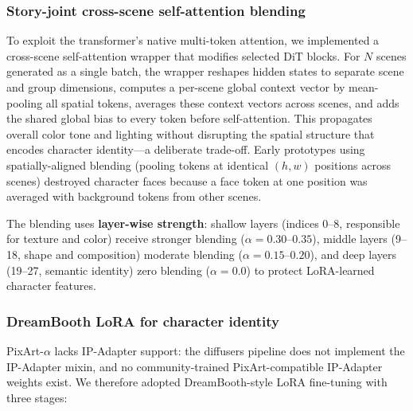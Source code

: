 \subsubsection{Story-joint cross-scene self-attention blending}

To exploit the transformer's native multi-token attention, we implemented a cross-scene self-attention wrapper that modifies selected DiT blocks. For $N$ scenes generated as a single batch, the wrapper reshapes hidden states to separate scene and group dimensions, computes a per-scene global context vector by mean-pooling all spatial tokens, averages these context vectors across scenes, and adds the shared global bias to every token before self-attention. This propagates overall color tone and lighting without disrupting the spatial structure that encodes character identity---a deliberate trade-off. Early prototypes using spatially-aligned blending (pooling tokens at identical $(h,w)$ positions across scenes) destroyed character faces because a face token at one position was averaged with background tokens from other scenes.

The blending uses \textbf{layer-wise strength}: shallow layers (indices 0--8, responsible for texture and color) receive stronger blending ($\alpha=0.30$--$0.35$), middle layers (9--18, shape and composition) moderate blending ($\alpha=0.15$--$0.20$), and deep layers (19--27, semantic identity) zero blending ($\alpha=0.0$) to protect LoRA-learned character features.

\subsubsection{DreamBooth LoRA for character identity}

PixArt-$\alpha$ lacks IP-Adapter support: the diffusers pipeline does not implement the IP-Adapter mixin, and no community-trained PixArt-compatible IP-Adapter weights exist. We therefore adopted DreamBooth-style LoRA fine-tuning with three stages:

